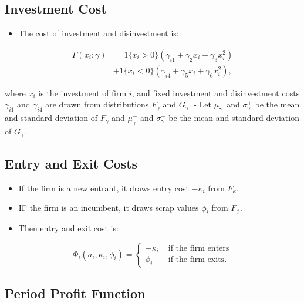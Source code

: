 \documentclass[]{book}
\providecommand{\tightlist}{%
  \setlength{\itemsep}{0pt}\setlength{\parskip}{0pt}}
\begin{document}
\subsection{Investment Cost}\label{investment-cost}

\begin{itemize}
\tightlist
\item
  The cost of investment and disinvestment is:
\end{itemize}

\begin{equation}
\begin{split}
\Gamma(x_i; \gamma) &= 1\{x_i > 0\}(\gamma_{i1} + \gamma_2 x_i + \gamma_3 x_i^2)\\
& + 1\{x_i < 0\}(\gamma_{i4} + \gamma_{5} x_i + \gamma_6 x_i^2),
\end{split}
\end{equation}

where \(x_i\) is the investment of firm \(i\), and fixed investment and
disinvestment costs \(\gamma_{i1}\) and \(\gamma_{i4}\) are drawn from
distributions \(F_{\gamma}\) and \(G_{\gamma}\). - Let \(\mu_\gamma^+\)
and \(\sigma_\gamma^+\) be the mean and standard deviation of
\(F_\gamma\) and \(\mu_\gamma^-\) and \(\sigma_\gamma^-\) be the mean
and standard deviation of \(G_\gamma\).

\subsection{Entry and Exit Costs}\label{entry-and-exit-costs}

\begin{itemize}
\tightlist
\item
  If the firm is a new entrant, it draws entry cost \(-\kappa_i\) from
  \(F_\kappa\).
\item
  IF the firm is an incumbent, it draws scrap values \(\phi_i\) from
  \(F_\phi\).
\item
  Then entry and exit cost is:
\end{itemize}

\begin{equation}
\Phi_i(a_i, \kappa_i, \phi_i) =
\begin{cases}
- \kappa_i &\text{   if the firm enters}\\
\phi_i &\text{   if the firm exits}.
\end{cases}
\end{equation}

\subsection{Period Profit Function}\label{period-profit-function}
\end{document}
